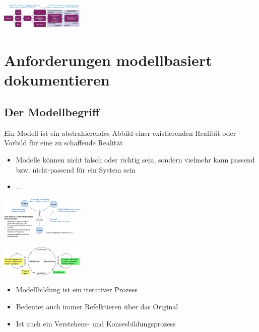 \documentclass{report}
\newenvironment{Figure}
	{\par\medskip\noindent\minipage{\linewidth}}
	{\endminipage\par\medskip}
\theoremstyle{definition}
\theoremstyle{example}
\begin{document}
\begin{Figure}
   \centering
    \includegraphics[width=150px]{img/SatzSchablone.png}
        \label{fig:vollstaendige Satzschablone}
\end{Figure}

\section{Anforderungen modellbasiert dokumentieren}

\subsection{Der Modellbegriff}
Ein Modell ist ein abstrahierendes Abbild einer existierenden Realität oder Vorbild für eine zu schaffende Realität
\begin{itemize}
   \item Modelle können nicht falsch oder richtig sein, sondern vielmehr kann passend bzw. nicht-passend für ein System sein
   \item ...
\end{itemize}

\begin{Figure}
   \centering
    \includegraphics[width=150px]{img/Modelleigenschaften.png}
        \label{fig:Eigenschaften von Modellen}
\end{Figure}

\begin{Figure}
   \centering
    \includegraphics[width=150px]{img/Modellschema.png}
        \label{fig:Prinzipschema von Modellen}
\end{Figure}
\begin{itemize}
   \item Modellbildung ist ein iterativer Prozess
   \item Bedeutet auch immer Refelktieren über das Original
   \item Ist auch ein Verstehens- und Konsesbildungsprozess
\end{itemize}
\end{document}
